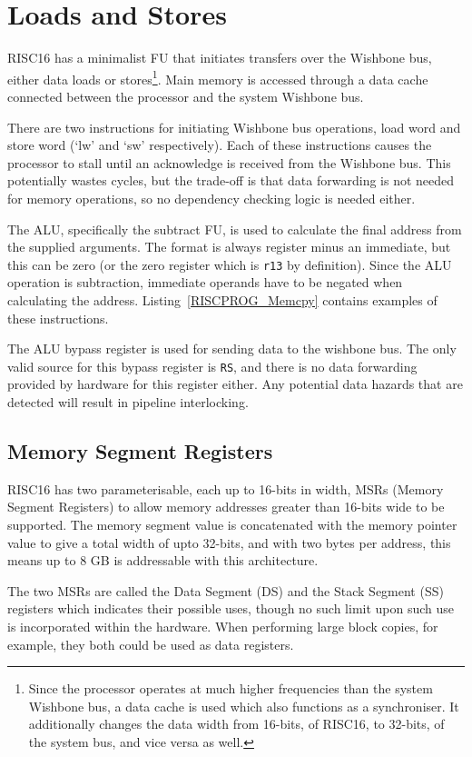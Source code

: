 \section{Loads and Stores}

RISC16 has a minimalist FU that initiates transfers over the Wishbone bus, either
data loads or stores\footnote{Since the processor operates at much higher
frequencies than the system Wishbone bus, a data cache is used which also
functions as a synchroniser. It additionally changes the data width from 16-bits,
of RISC16, to 32-bits, of the system bus, and vice versa as well.}. Main memory
is accessed through a data cache connected between the processor and the system
Wishbone bus.

There are two instructions for initiating Wishbone bus operations, load word and
store word (`lw' and `sw' respectively). Each of these instructions causes the
processor to stall until an acknowledge is received from the Wishbone bus. This
potentially wastes cycles, but the trade-off is that data forwarding is not
needed for memory operations, so no dependency checking logic is needed either.

The ALU, specifically the subtract FU, is used to calculate the final address
from the supplied arguments. The format is always register minus an immediate,
but this can be zero (or the zero register which is \texttt{r13} by definition).
Since the ALU operation is subtraction, immediate operands have to be negated
when calculating the address. Listing~\ref{RISCPROG_Memcpy} contains examples of
these instructions.

The ALU bypass register is used for sending data to the wishbone bus. The only
valid source for this bypass register is \texttt{RS}, and there is no data
forwarding provided by hardware for this register either. Any potential data
hazards that are detected will result in pipeline interlocking.


\subsection{Memory Segment Registers}
RISC16 has two parameterisable, each up to 16-bits in width, MSRs (Memory Segment
Registers) to allow memory addresses greater than 16-bits wide to be supported.
The memory segment value is concatenated with the memory pointer value to give a
total width of upto 32-bits, and with two bytes per address, this means up to 8
GB is addressable with this architecture.

The two MSRs are called the Data Segment (DS) and the Stack Segment (SS)
registers which indicates their possible uses, though no such limit upon such use
is incorporated within the hardware. When performing large block copies, for
example, they both could be used as data registers.


